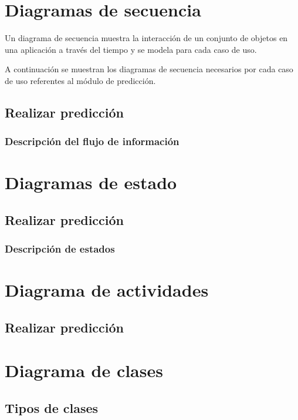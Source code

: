 \section{Diagramas de secuencia}
Un diagrama de secuencia muestra la interacción de un conjunto de objetos en una aplicación a través del tiempo y se modela para cada caso de uso.

A continuación se muestran los diagramas de secuencia necesarios por cada caso de uso referentes al módulo de predicción.
\subsection{Realizar predicción}

\subsubsection{Descripción del flujo de información}

\section{Diagramas de estado}

\subsection{Realizar predicción}

\subsubsection{Descripción de estados}

\section{Diagrama de actividades}

\subsection{Realizar predicción}

\section{Diagrama de clases}

\subsection{Tipos de clases}

